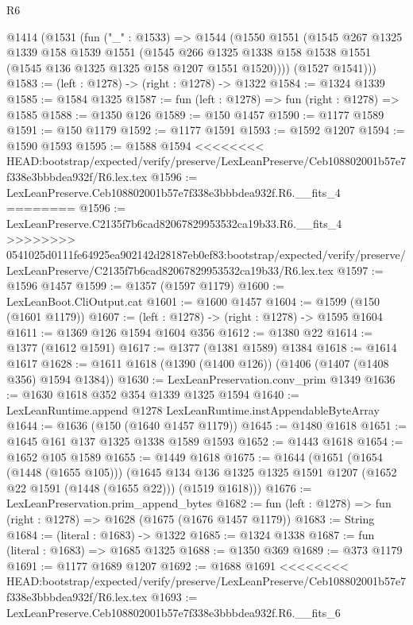 \begin{lexlean}{R6}
\begin{coremodule}
{{{{{{{{{{{{{{{{{{{{{{{{{{{{{{{{{{{{{{{{{{{{{{{{{{  @1414
    (@1531
      (fun ("_" : @1533) =>
      @1544
        (@1550
          @1551
          (@1545
            @267
            @1325
            @1339
            @158
            @1539
            @1551
            (@1545
              @266
              @1325
              @1338
              @158
              @1538
              @1551
              (@1545 @136 @1325 @1325 @158 @1207 @1551 @1520))))
        (@1527 @1541)))
@1583 := (left : @1278) -> (right : @1278) -> @1322
@1584 := @1324 @1339
@1585 := @1584 @1325
@1587 := fun (left : @1278) => fun (right : @1278) => @1585
@1588 := @1350 @126
@1589 := @150 @1457
@1590 := @1177 @1589
@1591 := @150 @1179
@1592 := @1177 @1591
@1593 := @1592 @1207
@1594 := @1590 @1593
@1595 := @1588 @1594
<<<<<<<< HEAD:bootstrap/expected/verify/preserve/LexLeanPreserve/Ceb108802001b57e7f338e3bbbdea932f/R6.lex.tex
@1596 := LexLeanPreserve.Ceb108802001b57e7f338e3bbbdea932f.R6.__fits_4
========
@1596 := LexLeanPreserve.C2135f7b6cad82067829953532ca19b33.R6.__fits_4
>>>>>>>> 0541025d0111fe64925ea902142d28187eb0ef83:bootstrap/expected/verify/preserve/LexLeanPreserve/C2135f7b6cad82067829953532ca19b33/R6.lex.tex
@1597 := @1596 @1457
@1599 := @1357 (@1597 @1179)
@1600 := LexLeanBoot.CliOutput.cat
@1601 := @1600 @1457
@1604 := @1599 (@150 (@1601 @1179))
@1607 := (left : @1278) -> (right : @1278) -> @1595 @1604
@1611 := @1369 @126 @1594 @1604 @356
@1612 := @1380 @22
@1614 := @1377 (@1612 @1591)
@1617 := @1377 (@1381 @1589) @1384
@1618 := @1614 @1617
@1628 := @1611 @1618 (@1390 (@1400 @126)) (@1406 (@1407 (@1408 @356) @1594 @1384))
@1630 := LexLeanPreservation.conv_prim @1349
@1636 := @1630 @1618 @352 @354 @1339 @1325 @1594
@1640 := LexLeanRuntime.append @1278 LexLeanRuntime.instAppendableByteArray
@1644 := @1636 (@150 (@1640 @1457 @1179))
@1645 := @1480 @1618
@1651 := @1645 @161 @137 @1325 @1338 @1589 @1593
@1652 := @1443 @1618
@1654 := @1652 @105 @1589
@1655 := @1449 @1618
@1675 := @1644
    (@1651
      (@1654 (@1448 (@1655 @105)))
      (@1645 @134 @136 @1325 @1325 @1591 @1207 (@1652 @22 @1591 (@1448 (@1655 @22))) (@1519 @1618)))
@1676 := LexLeanPreservation.prim_append_bytes
@1682 := fun (left : @1278) => fun (right : @1278) => @1628 (@1675 (@1676 @1457 @1179))
@1683 := String
@1684 := (literal : @1683) -> @1322
@1685 := @1324 @1338
@1687 := fun (literal : @1683) => @1685 @1325
@1688 := @1350 @369
@1689 := @373 @1179
@1691 := @1177 @1689 @1207
@1692 := @1688 @1691
<<<<<<<< HEAD:bootstrap/expected/verify/preserve/LexLeanPreserve/Ceb108802001b57e7f338e3bbbdea932f/R6.lex.tex
@1693 := LexLeanPreserve.Ceb108802001b57e7f338e3bbbdea932f.R6.__fits_6
}}}}}}}}}}}}}}}}}}}}}}}}}}}}}}}}}}}}}}}}}}}}}}}}}}
\end{coremodule}
\end{lexlean}
